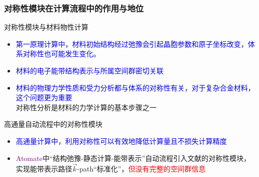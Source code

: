 \documentclass[cjk,slidestop,handout,compress,mathserif,blue]{beamer}	%
\newcommand{\upcite}[1]{\hspace{0ex}\textsuperscript{\cite{#1}}} %
\begin{document}
\frame
{
	\frametitle{对称性模块在计算流程中的作用与地位}
	对称性模块与材料物性计算
	\begin{itemize}
		\item \textcolor{blue}{第一原理计算中，材料初始结构经过弛豫会引起晶胞参数和原子坐标改变，体系对称性也可能发生变化。}
		\item \textcolor{blue}{材料的电子能带结构表示与所属空间群密切关联}
		\item \textcolor{blue}{材料的物理力学性质和受力分析都与体系的对称性有关，对于复杂合金材料，这个问题更为重要}\\
			对称性分析是材料的力学计算的基本步骤之一
	\end{itemize}
	\vskip 30pt
	高通量自动流程中的对称性模块
	\begin{itemize}
		\item \textcolor{blue}{高通量计算中，利用对称性可以有效地降低计算量且不损失计算精度}
		\item \textcolor{purple}{\textrm{Atomate}}中“结构弛豫-静态计算-能带表示”自动流程引入文献\cite{CMS49-299_2010}的对称性模块，实现能带表示路径$\vec k$-\textrm{path}“标准化”，\textcolor{red}{但没有完整的空间群信息}
	\end{itemize}
}

\end{document}
